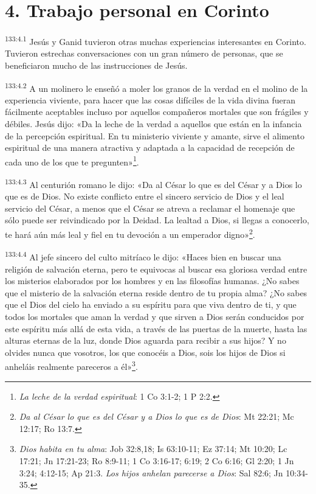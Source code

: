 \section*{4. Trabajo personal en Corinto}
\par
\textsuperscript{133:4.1} Jesús y Ganid tuvieron otras muchas experiencias interesantes en Corinto. Tuvieron estrechas conversaciones con un gran número de personas, que se beneficiaron mucho de las instrucciones de Jesús.

\par
\textsuperscript{133:4.2} A un molinero le enseñó a moler los granos de la verdad en el molino de la experiencia viviente, para hacer que las cosas difíciles de la vida divina fueran fácilmente aceptables incluso por aquellos compañeros mortales que son frágiles y débiles. Jesús dijo: «Da la leche de la verdad a aquellos que están en la infancia de la percepción espiritual. En tu ministerio viviente y amante, sirve el alimento espiritual de una manera atractiva y adaptada a la capacidad de recepción de cada uno de los que te pregunten»\footnote{\textit{La leche de la verdad espiritual}: 1 Co 3:1-2; 1 P 2:2.}.

\par
\textsuperscript{133:4.3} Al centurión romano le dijo: «Da al César lo que es del César y a Dios lo que es de Dios. No existe conflicto entre el sincero servicio de Dios y el leal servicio del César, a menos que el César se atreva a reclamar el homenaje que sólo puede ser reivindicado por la Deidad. La lealtad a Dios, si llegas a conocerlo, te hará aún más leal y fiel en tu devoción a un emperador digno»\footnote{\textit{Da al César lo que es del César y a Dios lo que es de Dios}: Mt 22:21; Mc 12:17; Ro 13:7.}.

\par
\textsuperscript{133:4.4} Al jefe sincero del culto mitríaco le dijo: «Haces bien en buscar una religión de salvación eterna, pero te equivocas al buscar esa gloriosa verdad entre los misterios elaborados por los hombres y en las filosofías humanas. ¿No sabes que el misterio de la salvación eterna reside dentro de tu propia alma? ¿No sabes que el Dios del cielo ha enviado a su espíritu para que viva dentro de ti, y que todos los mortales que aman la verdad y que sirven a Dios serán conducidos por este espíritu más allá de esta vida, a través de las puertas de la muerte, hasta las alturas eternas de la luz, donde Dios aguarda para recibir a sus hijos? Y no olvides nunca que vosotros, los que conocéis a Dios, sois los hijos de Dios si anheláis realmente pareceros a él»\footnote{\textit{Dios habita en tu alma}: Job 32:8,18; Is 63:10-11; Ez 37:14; Mt 10:20; Lc 17:21; Jn 17:21-23; Ro 8:9-11; 1 Co 3:16-17; 6:19; 2 Co 6:16; Gl 2:20; 1 Jn 3:24; 4:12-15; Ap 21:3. \textit{Los hijos anhelan parecerse a Dios}: Sal 82:6; Jn 10:34-35.}.

